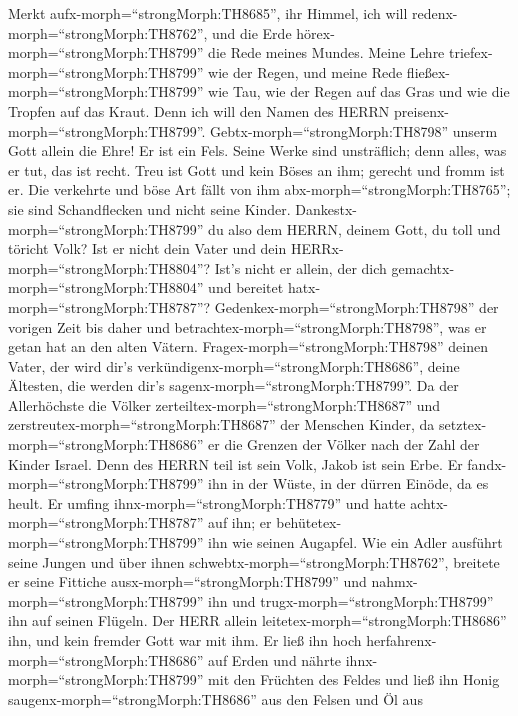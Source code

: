  Merkt aufx-morph=``strongMorph:TH8685'', ihr Himmel, ich
will redenx-morph=``strongMorph:TH8762'', und die Erde
hörex-morph=``strongMorph:TH8799'' die Rede meines Mundes. 
Meine Lehre triefex-morph=``strongMorph:TH8799'' wie der Regen, und
meine Rede fließex-morph=``strongMorph:TH8799'' wie Tau, wie der Regen
auf das Gras und wie die Tropfen auf das Kraut.  Denn ich
will den Namen des HERRN preisenx-morph=``strongMorph:TH8799''.
Gebtx-morph=``strongMorph:TH8798'' unserm Gott allein die Ehre!
 Er ist ein Fels. Seine Werke sind unsträflich; denn alles,
was er tut, das ist recht. Treu ist Gott und kein Böses an ihm; gerecht
und fromm ist er.  Die verkehrte und böse Art fällt von ihm
abx-morph=``strongMorph:TH8765''; sie sind Schandflecken und nicht seine
Kinder.  Dankestx-morph=``strongMorph:TH8799'' du also dem
HERRN, deinem Gott, du toll und töricht Volk? Ist er nicht dein Vater
und dein HERRx-morph=``strongMorph:TH8804''? Ist's nicht er allein, der
dich gemachtx-morph=``strongMorph:TH8804'' und bereitet
hatx-morph=``strongMorph:TH8787''? 
Gedenkex-morph=``strongMorph:TH8798'' der vorigen Zeit bis daher und
betrachtex-morph=``strongMorph:TH8798'', was er getan hat an den alten
Vätern. Fragex-morph=``strongMorph:TH8798'' deinen Vater, der wird dir's
verkündigenx-morph=``strongMorph:TH8686'', deine Ältesten, die werden
dir's sagenx-morph=``strongMorph:TH8799''.  Da der
Allerhöchste die Völker zerteiltex-morph=``strongMorph:TH8687'' und
zerstreutex-morph=``strongMorph:TH8687'' der Menschen Kinder, da
setztex-morph=``strongMorph:TH8686'' er die Grenzen der Völker nach der
Zahl der Kinder Israel.  Denn des HERRN teil ist sein Volk,
Jakob ist sein Erbe.  Er fandx-morph=``strongMorph:TH8799''
ihn in der Wüste, in der dürren Einöde, da es heult. Er umfing
ihnx-morph=``strongMorph:TH8779'' und hatte
achtx-morph=``strongMorph:TH8787'' auf ihn; er
behütetex-morph=``strongMorph:TH8799'' ihn wie seinen Augapfel.
 Wie ein Adler ausführt seine Jungen und über ihnen
schwebtx-morph=``strongMorph:TH8762'', breitete er seine Fittiche
ausx-morph=``strongMorph:TH8799'' und nahmx-morph=``strongMorph:TH8799''
ihn und trugx-morph=``strongMorph:TH8799'' ihn auf seinen Flügeln.
 Der HERR allein leitetex-morph=``strongMorph:TH8686'' ihn,
und kein fremder Gott war mit ihm.  Er ließ ihn hoch
herfahrenx-morph=``strongMorph:TH8686'' auf Erden und nährte
ihnx-morph=``strongMorph:TH8799'' mit den Früchten des Feldes und ließ
ihn Honig saugenx-morph=``strongMorph:TH8686'' aus den Felsen und Öl aus
